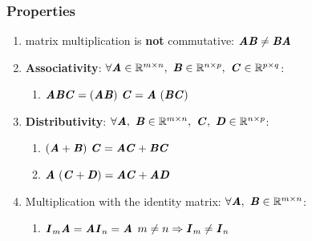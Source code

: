 \subsubsection{Properties}

\begin{enumerate}
    \item matrix multiplication is \textbf{not} commutative: $\text{\textbf{\textit{AB}}} \neq \text{\textbf{\textit{BA}}}$
    \hfill \cite{mfml/book/mml/Deisenroth-Faisal-Ong}

    \item \textbf{Associativity}: 
    $
        \forall 
        \matname{A} \in \mathbb{R}^{m\times n},\ 
        \matname{B} \in \mathbb{R}^{n\times p},\ 
        \matname{C} \in \mathbb{R}^{p\times q}
    $:
    
        \begin{enumerate}
            \item $\matname{ABC} = (\matname{AB})\ \matname{C} = \matname{A}\ (\matname{BC})$
            \hfill \cite{mfml/book/mml/Deisenroth-Faisal-Ong}
        \end{enumerate}

    \item \textbf{Distributivity}: 
    $
        \forall 
        \matname{A},\ \matname{B}\in \mathbb{R}^{m\times n},\ 
        \matname{C},\ \matname{D}\in \mathbb{R}^{n\times p}
    $:

        \begin{enumerate}
            \item $(\matname{A} + \matname{B})\ \matname{C} = \matname{AC} + \matname{BC}$
            \hfill \cite{mfml/book/mml/Deisenroth-Faisal-Ong}
            
            \item $\text{\textbf{\textit{A}}}\ (\text{\textbf{\textit{C}}} + \text{\textbf{\textit{D}}}) = \text{\textbf{\textit{AC}}} + \text{\textbf{\textit{AD}}}$
            \hfill \cite{mfml/book/mml/Deisenroth-Faisal-Ong}
        \end{enumerate}

    \item Multiplication with the identity matrix: 
    $
        \forall 
        \text{\textbf{\textit{A}}},\ \text{\textbf{\textit{B}}}\in \mathbb{R}^{m\times n}
    $:
        \begin{enumerate}
            \item $\text{\textbf{\textit{I}}}_m\text{\textbf{\textit{A}}} = \text{\textbf{\textit{AI}}}_n = \text{\textbf{\textit{A}}}$
            \hfill $m\neq n \Rightarrow \text{\textbf{\textit{I}}}_m \neq \text{\textbf{\textit{I}}}_n$
            \hfill \cite{mfml/book/mml/Deisenroth-Faisal-Ong}
        \end{enumerate}
\end{enumerate}















